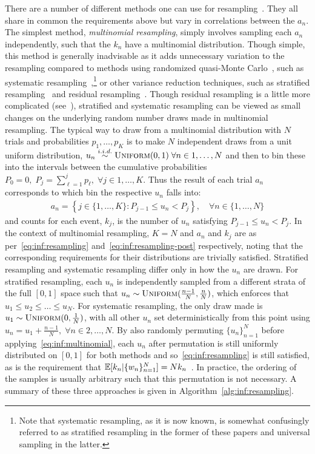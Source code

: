 There are a number of different methods one can use for resampling~\citep{douc2005comparison}.  They all share in 
common the requirements above but vary in correlations between the $a_n$.  The simplest
method, \emph{multinomial resampling}, simply involves sampling each $a_n$ independently,
such that the $k_n$ have a multinomial distribution.  Though simple, this method is generally
inadvisable as it adds unnecessary variation to the resampling compared to methods using randomized
quasi-Monte Carlo~\citep{l2005recent}, such as systematic 
resampling~\citep{carpenter1999improved,whitley1994genetic},\footnote{Note that systematic resampling, as it is now known, is
	somewhat confusingly referred to as stratified resampling in the former of these papers and universal
	sampling in the latter.}
or other variance reduction techniques, such as stratified 
resampling~\citep{kitagawa1996monte} and residual resampling~\citep{whitley1994genetic}.
Though residual resampling is a little more complicated (see~\cite{douc2005comparison}),
stratified and systematic resampling can be viewed as small changes on the underlying random
number draws made in multinomial resampling.  The typical way to draw from a multinomial
distribution with $N$ trials and probabilities $p_1,\dots,p_K$ is to make $N$ independent
draws from a unit uniform distribution, $u_n \overset{i.i.d.}{\sim} \textsc{Uniform}(0,1) \; \forall n\in1,\dots,N$
and then to bin these into the intervals between the cumulative probabilities
$P_0 = 0, \; P_{j} = \sum_{\ell=1}^{j} p_{\ell}, \; \forall j\in1,\dots,K$.  Thus 
the result of each trial $a_n$ corresponds to which bin the respective $u_n$ falls into:
\begin{align}
\label{eq:inf:multinomial}
a_n = \left\{j \in \{1,\dots,K\} \colon P_{j-1} \le u_n < P_j\right\}, \quad \forall n \in \{1,\dots,N\}
\end{align}
and counts for each event, $k_j$, is the number of $u_n$ satisfying $P_{j-1} \le u_n < P_j$.
In the context of multinomial resampling, $K=N$ and $a_n$ and $k_j$ are as per~\eqref{eq:inf:resampling}
and~\eqref{eq:inf:resampling-post} respectively, noting that the corresponding requirements
for their distributions are trivially satisfied.
Stratified resampling and systematic resampling differ only in how the $u_n$ are drawn. 
For stratified resampling, each $u_n$ is independently sampled from a different strata of the full
$[0,1]$ space such that $u_n \sim \textsc{Uniform}(\frac{n-1}{N},\frac{n}{N})$, which enforces
that $u_1 \le u_2 \le \dots \le u_N$.  For systematic resampling, the only draw made is
$u_1 \sim \textsc{Uniform}(0,\frac{1}{N})$, with all other $u_n$ set deterministically from this
point using $u_n = u_1+\frac{n-1}{N}, \; \forall n\in2,\dots,N$.
By also randomly permuting $\{u_{n}\}_{n=1}^N$ before
applying~\eqref{eq:inf:multinomial}, each $u_n$ after permutation is still 
uniformly distributed on $[0,1]$ for both methods and so~\eqref{eq:inf:resampling} is still satisfied, 
as is the requirement that $\mathbb{E}[k_n | \{w_n\}_{n=1}^N] = Nk_n$~\citep{douc2005comparison}.
In practice, the ordering of the samples is usually arbitrary such that this permutation is not necessary.
A summary of these three approaches is given in Algorithm~\ref{alg:inf:resampling}.

